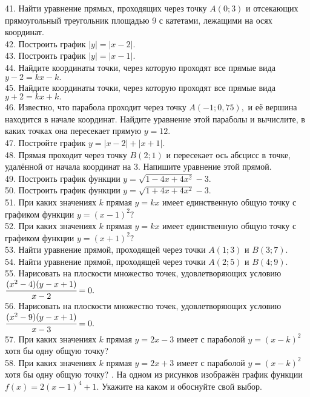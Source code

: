 41. Найти уравнение прямых, проходящих через точку $A(0;3)$ и отсекающих прямоугольный треугольник площадью 9 с катетами, лежащими на осях координат.\\
42. Построить график $|y|=|x-2|.$\\
43. Построить график $|y|=|x-1|.$\\
44. Найдите координаты точки, через которую проходят все прямые вида $y-2=kx-k.$\\
45. Найдите координаты точки, через которую проходят все прямые вида $y+2=kx+k.$\\
46. Известно, что парабола проходит через точку $A(-1;0,75),$ и её вершина находится в начале координат. Найдите уравнение этой параболы и вычислите, в каких точках она пересекает прямую $y=12.$\\
47. Постройте график $y=|x-2|+|x+1|.$\\
48. Прямая проходит через точку $B(2;1)$ и пересекает ось абсцисс в точке, удалённой от начала координат на 3. Напишите уравнение этой прямой.\\
49. Построить график функции $y=\sqrt{1-4x+4x^2}-3.$\\
50. Построить график функции $y=\sqrt{1+4x+4x^2}-3.$\\
51. При каких значениях $k$ прямая $y=kx$ имеет единственную общую точку
с графиком функции $y=(x-1)^2?$\\
52. При каких значениях $k$ прямая $y=kx$ имеет единственную общую точку
с графиком функции $y=(x+1)^2?$\\
53. Найти уравнение прямой, проходящей через точки $A(1;3)$ и $B(3;7).$\\
54. Найти уравнение прямой, проходящей через точки $A(2;5)$ и $B(4;9).$\\
55. Нарисовать на плоскости множество точек, удовлетворяющих условию
$\cfrac{(x^2-4)(y-x+1)}{x-2}=0.$\\
56. Нарисовать на плоскости множество точек, удовлетворяющих условию
$\cfrac{(x^2-9)(y-x+1)}{x-3}=0.$\\
57. При каких значениях $k$ прямая $y=2x-3$ имеет с параболой $y=(x-k)^2$ хотя бы одну общую точку?\\
58. При каких значениях $k$ прямая $y=2x+3$ имеет с параболой $y=(x-k)^2$ хотя бы одну общую точку?
\newpage
{}. На одном из рисунков изображён график функции $f(x)=2(x-1)^4+1.$ Укажите на каком и обоснуйте свой выбор.\\
